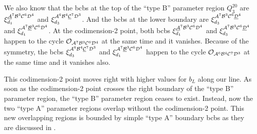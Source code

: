 We also know that the \glspl{bcb} at the top of the ``type B'' parameter region $Q^{20}_3$ are $\xi_{d_1}^{\underline{\mathcal{A}}^7\mathcal{B}^3\mathcal{C}^6\mathcal{D}^4}$ and $\xi_{d_3}^{\mathcal{A}^6\mathcal{B}^4\underline{\mathcal{C}}^7\mathcal{D}^3}$.
And the \glspl{bcb} at the lower boundary are $\xi_{d_3}^{\mathcal{A}^7\mathcal{B}^3\mathcal{C}^6\underline{\mathcal{D}}^4}$ and $\xi_{d_1}^{\mathcal{A}^7\underline{\mathcal{B}}^3\mathcal{C}^6\mathcal{D}^4}$.
At the codimension-2 point, both \glspl{bcb} $\xi_{d_1}^{\underline{\mathcal{A}}^7\mathcal{B}^3\mathcal{C}^6\mathcal{D}^4}$ and $\xi_{d_3}^{\mathcal{A}^7\mathcal{B}^3\mathcal{C}^6\underline{\mathcal{D}}^4}$ happen to the cycle $\mathcal{O}_{\mathcal{A}^7\mathcal{B}^3\mathcal{C}^6\mathcal{D}^4}$ at the same time and it vanishes.
Because of the symmetry, the \glspl{bcb} $\xi_{d_3}^{\mathcal{A}^6\mathcal{B}^4\underline{\mathcal{C}}^7\mathcal{D}^3}$ and $\xi_{d_1}^{\mathcal{A}^7\underline{\mathcal{B}}^3\mathcal{C}^6\mathcal{D}^4}$ happen to the cycle $\mathcal{O}_{\mathcal{A}^6\mathcal{B}^4\mathcal{C}^7\mathcal{D}^3}$ at the same time and it vanishes also.

This codimension-2 point moves right with higher values for $b_L$ along our line.
As soon as the codimension-2 point crosses the right boundary of the ``type B'' parameter region, the ``type B'' parameter region ceases to exist.
Instead, now the two ``type A'' parameter regions overlap without the codimension-2 point.
This new overlapping regions is bounded by simple ``type A'' boundary \glspl{bcb} as they are discussed in .



